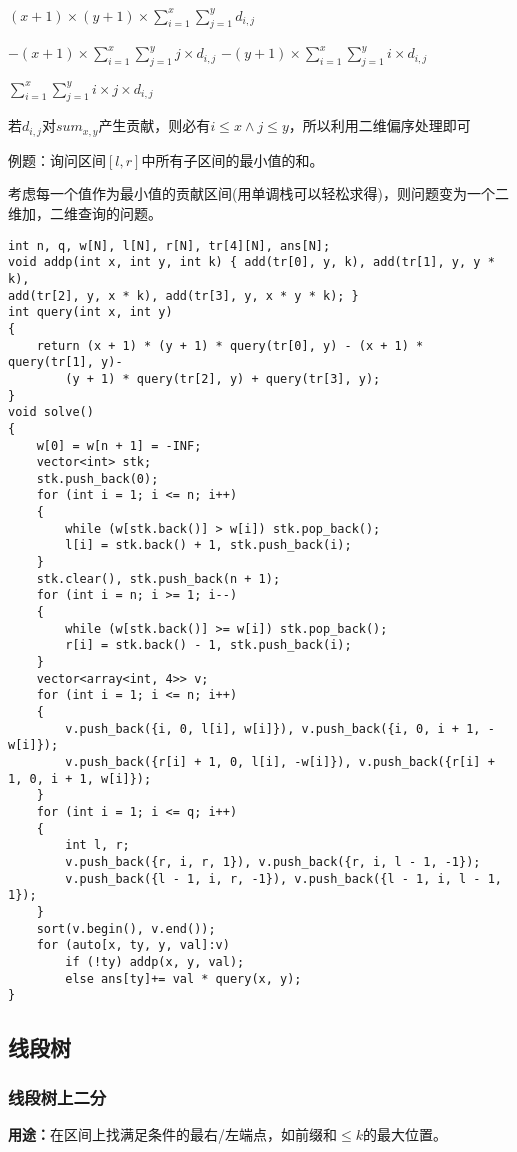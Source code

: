 \documentclass[a4paper,fontset=none]{ctexart}
\begin{document}
$(x+1)\times (y+1)\times \sum_{i=1}^x\sum_{j=1}^y d_{i,j}$

$-(x+1)\times \sum_{i=1}^x\sum_{j=1}^y j\times d_{i,j}$
$-(y+1)\times \sum_{i=1}^x\sum_{j=1}^y i\times d_{i,j}$

$\sum_{i=1}^x\sum_{j=1}^y i\times j\times d_{i,j}$

若$d_{i,j}$对$sum_{x,y}$产生贡献，则必有$i\leqslant x\land j\leqslant y$，所以利用二维偏序处理即可

例题：询问区间$[l,r]$中所有子区间的最小值的和。

考虑每一个值作为最小值的贡献区间(用单调栈可以轻松求得)，则问题变为一个二维加，二维查询的问题。

\begin{verbatim}
int n, q, w[N], l[N], r[N], tr[4][N], ans[N];
void addp(int x, int y, int k) { add(tr[0], y, k), add(tr[1], y, y * k),
add(tr[2], y, x * k), add(tr[3], y, x * y * k); }
int query(int x, int y)
{
    return (x + 1) * (y + 1) * query(tr[0], y) - (x + 1) * query(tr[1], y)-
        (y + 1) * query(tr[2], y) + query(tr[3], y);
}
void solve()
{
    w[0] = w[n + 1] = -INF;
    vector<int> stk;
    stk.push_back(0);
    for (int i = 1; i <= n; i++)
    {
        while (w[stk.back()] > w[i]) stk.pop_back();
        l[i] = stk.back() + 1, stk.push_back(i);
    }
    stk.clear(), stk.push_back(n + 1);
    for (int i = n; i >= 1; i--)
    {
        while (w[stk.back()] >= w[i]) stk.pop_back();
        r[i] = stk.back() - 1, stk.push_back(i);
    }
    vector<array<int, 4>> v;
    for (int i = 1; i <= n; i++)
    {
        v.push_back({i, 0, l[i], w[i]}), v.push_back({i, 0, i + 1, -w[i]});
        v.push_back({r[i] + 1, 0, l[i], -w[i]}), v.push_back({r[i] + 1, 0, i + 1, w[i]});
    }
    for (int i = 1; i <= q; i++)
    {
        int l, r;
        v.push_back({r, i, r, 1}), v.push_back({r, i, l - 1, -1});
        v.push_back({l - 1, i, r, -1}), v.push_back({l - 1, i, l - 1, 1});
    }
    sort(v.begin(), v.end());
    for (auto[x, ty, y, val]:v)
        if (!ty) addp(x, y, val);
        else ans[ty]+= val * query(x, y);
}
\end{verbatim}
\subsection{线段树}
\subsubsection{线段树上二分}
\textbf{用途：}在区间上找满足条件的最右/左端点，如前缀和$\leq k$的最大位置。
\end{document}
